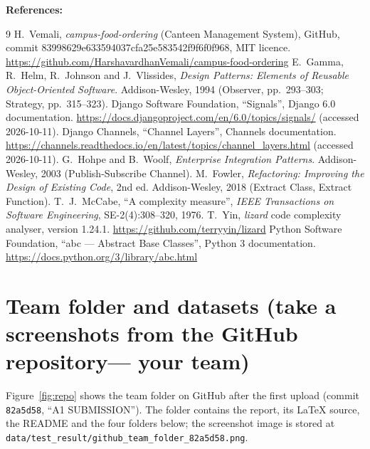 \documentclass[11pt,a4paper]{article}
\newcommand{\entry}[1]{\par\textbf{#1:} }
\newcommand{\code}[1]{\nolinkurl{#1}}
\begin{document}
\entry{References}
\renewcommand{\refname}{}\vspace{-2.5em}
\begin{thebibliography}{9}\small
{} H.~Vemali, \emph{campus-food-ordering} (Canteen Management System), GitHub, commit 83998629e633594037cfa25e583542f9f6f0f968, MIT licence. \url{https://github.com/HarshavardhanVemali/campus-food-ordering}
 E.~Gamma, R.~Helm, R.~Johnson and J.~Vlissides, \emph{Design Patterns: Elements of Reusable Object-Oriented Software}. Addison-Wesley, 1994 (Observer, pp.~293--303; Strategy, pp.~315--323).
 Django Software Foundation, ``Signals'', Django 6.0 documentation. \url{https://docs.djangoproject.com/en/6.0/topics/signals/} (accessed 2026-10-11).
 Django Channels, ``Channel Layers'', Channels documentation. \url{https://channels.readthedocs.io/en/latest/topics/channel_layers.html} (accessed 2026-10-11).
 G.~Hohpe and B.~Woolf, \emph{Enterprise Integration Patterns}. Addison-Wesley, 2003 (Publish-Subscribe Channel).
 M.~Fowler, \emph{Refactoring: Improving the Design of Existing Code}, 2nd ed. Addison-Wesley, 2018 (Extract Class, Extract Function).
 T.~J.~McCabe, ``A complexity measure'', \emph{IEEE Transactions on Software Engineering}, SE-2(4):308--320, 1976.
 T.~Yin, \emph{lizard} code complexity analyser, version 1.24.1. \url{https://github.com/terryyin/lizard}
 Python Software Foundation, ``abc --- Abstract Base Classes'', Python 3 documentation. \url{https://docs.python.org/3/library/abc.html}
\end{thebibliography}

\section{Team folder and datasets (take a screenshots from the GitHub repository— your team)}
Figure~\ref{fig:repo} shows the team folder on GitHub after the first upload (commit \code{82a5d58}, ``A1 SUBMISSION''). The folder contains the report, its LaTeX source, the README and the four folders below; the screenshot image is stored at \code{data/test_result/github_team_folder_82a5d58.png}.
\end{document}
